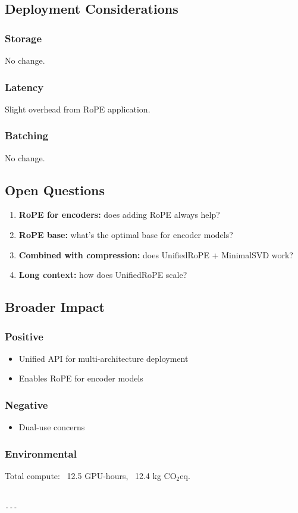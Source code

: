 \subsection{Deployment Considerations}

\subsubsection{Storage}
No change.

\subsubsection{Latency}
Slight overhead from RoPE application.

\subsubsection{Batching}
No change.

\subsection{Open Questions}

\begin{enumerate}
\item \textbf{RoPE for encoders:} does adding RoPE always help?
\item \textbf{RoPE base:} what's the optimal base for encoder models?
\item \textbf{Combined with compression:} does UnifiedRoPE + MinimalSVD work?
\item \textbf{Long context:} how does UnifiedRoPE scale?

\end{enumerate}
\subsection{Broader Impact}

\subsubsection{Positive}
\begin{itemize}
\item Unified API for multi-architecture deployment
\item Enables RoPE for encoder models

\end{itemize}
\subsubsection{Negative}
\begin{itemize}
\item Dual-use concerns

\end{itemize}
\subsubsection{Environmental}
Total compute: ~12.5 GPU-hours, ~12.4 kg CO$_2$eq.
\begin{lstlisting}

---
\end{lstlisting}